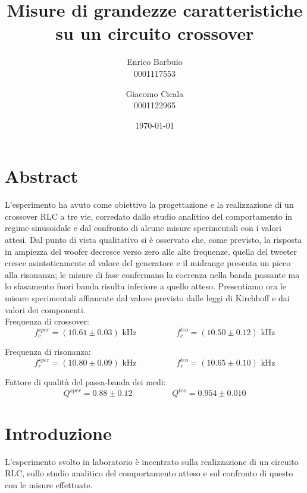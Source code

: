 \documentclass[12pt,italian]{article}
\title{Misure di grandezze caratteristiche su un circuito crossover}
\author{Enrico Barbuio \\ 0001117553 \and Giacomo Cicala \\ 0001122965}
\date{\today}
\begin{document}
\maketitle
\section*{Abstract}
L'esperimento ha avuto come obiettivo la progettazione e la realizzazione di un
crossover RLC a tre vie, corredato dallo studio analitico del comportamento in
regime sinusoidale e dal confronto di alcune misure sperimentali con i valori
attesi. Dal punto di vista qualitativo si è osservato che, come previsto, la risposta in
ampiezza del woofer decresce verso zero alle alte frequenze, quella del tweeter
cresce asintoticamente al valore del generatore e il midrange presenta un picco
alla risonanza; le misure di fase confermano la coerenza nella banda passante
ma lo sfasamento fuori banda risulta inferiore a quello atteso. Presentiamo ora
le misure sperimentali affiancate dal valore previsto dalle leggi di Kirchhoff
e dai valori dei componenti.\\ Frequenza di crossover:
\begin{equation*}
	f_{c}^{sper} = (10.61 \pm 0.03) \text{ kHz} \hspace{2cm} f_{c}^{teo} = (10.50
	\pm 0.12) \text{ kHz}
\end{equation*}

\noindent
Frequenza di risonanza:
\begin{equation*}
	f_{r}^{sper} = (10.80 \pm 0.09) \text{ kHz} \hspace{2cm} f_{r}^{teo} = (10.65
	\pm 0.10) \text{ kHz}
\end{equation*}

\noindent
Fattore di qualità del passa-banda dei medi:
\begin{equation*}
	Q^{sper} = 0.88 \pm 0.12  \hspace{2cm}  Q^{teo} = 0.954 \pm 0.010
\end{equation*}

\section*{Introduzione}

L'esperimento svolto in laboratorio è incentrato sulla realizzazione di un
circuito RLC, sullo studio analitico del comportamento atteso e sul confronto
di questo con le misure effettuate.
\end{document}
